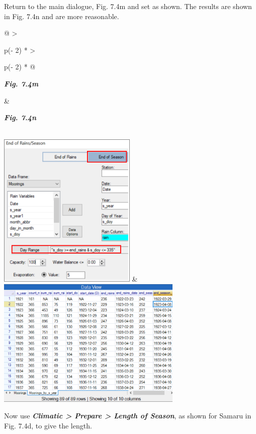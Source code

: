\documentclass[
  letterpaper,
  DIV=11,
  numbers=noendperiod]{scrreprt}
\begin{document}
Return to the main dialogue, Fig. 7.4m and set as shown. The results are
shown in Fig. 7.4n and are more reasonable.

\begin{longtable}[]{@{}
  >{\raggedright\arraybackslash}p{(\columnwidth - 2\tabcolsep) * }
  >{\raggedright\arraybackslash}p{(\columnwidth - 2\tabcolsep) * }@{}}
\toprule\noalign{}
\begin{minipage}[b]{\linewidth}\raggedright
\textbf{\emph{Fig. 7.4m}}
\end{minipage} & \begin{minipage}[b]{\linewidth}\raggedright
\textbf{\emph{Fig. 7.4n}}
\end{minipage} \\
\midrule\noalign{}
\endhead
\bottomrule\noalign{}
\endlastfoot
\includegraphics[width=2.60377in,height=2.94993in]{figures/Fig7.4m.png}
&
\includegraphics[width=3.49007in,height=2.43485in]{figures/Fig7.4n.png} \\
\end{longtable}

Now use \textbf{\emph{Climatic \textgreater{} Prepare \textgreater{}
Length of Season}}, as shown for Samaru in Fig. 7.4d, to give the
length.
\end{document}
